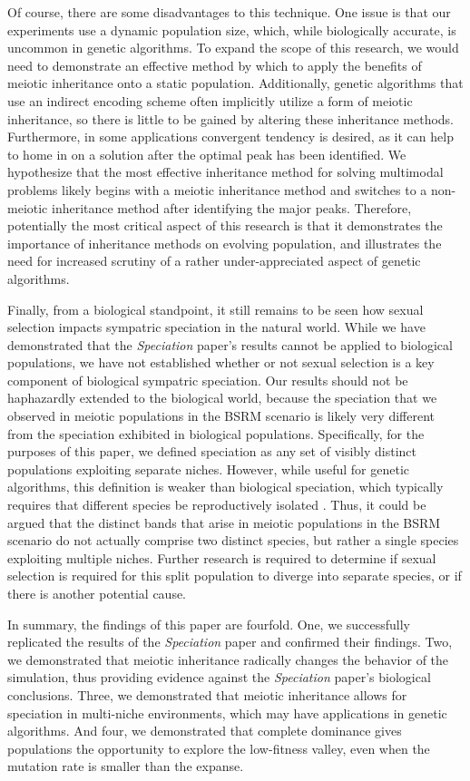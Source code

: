 \documentclass{article}
\begin{document}
Of course, there are some disadvantages to this technique. One issue is that our experiments use a dynamic population size, which, while biologically accurate, is uncommon in genetic algorithms. To expand the scope of this research, we would need to demonstrate an effective method by which to apply the benefits of meiotic inheritance onto a static population. Additionally, genetic algorithms that use an indirect encoding scheme often implicitly utilize a form of meiotic inheritance, so there is little to be gained by altering these inheritance methods. Furthermore, in some applications convergent tendency is desired, as it can help to home in on a solution after the optimal peak has been identified. We hypothesize that the most effective inheritance method for solving multimodal problems likely begins with a meiotic inheritance method and switches to a non-meiotic inheritance method after identifying the major peaks. Therefore, potentially the most critical aspect of this research is that it demonstrates the importance of inheritance methods on evolving population, and illustrates the need for increased scrutiny of a rather under-appreciated aspect of genetic algorithms.

Finally, from a biological standpoint, it still remains to be seen how sexual selection impacts sympatric speciation in the natural world. While we have demonstrated that the \textit{Speciation} paper’s results cannot be applied to biological populations, we have not established whether or not sexual selection is a key component of biological sympatric speciation. Our results should not be haphazardly extended to the biological world, because the speciation that we observed in meiotic populations in the BSRM scenario is likely very different from the speciation exhibited in biological populations. Specifically, for the purposes of this paper, we defined speciation as any set of visibly distinct populations exploiting separate niches. However, while useful for genetic algorithms, this definition is weaker than biological speciation, which typically requires that different species be reproductively isolated \cite{TEXTBOOK}. Thus, it could be argued that the distinct bands that arise in meiotic populations in the BSRM scenario do not actually comprise two distinct species, but rather a single species exploiting multiple niches. Further research is required to determine if sexual selection is required for this split population to diverge into separate species, or if there is another potential cause.

In summary, the findings of this paper are fourfold. One, we successfully replicated the results of the \textit{Speciation} paper and confirmed their findings. Two, we demonstrated that meiotic inheritance radically changes the behavior of the simulation, thus providing evidence against the \textit{Speciation} paper's biological conclusions. Three, we demonstrated that meiotic inheritance allows for speciation in multi-niche environments, which may have applications in genetic algorithms. And four, we demonstrated that complete dominance gives populations the opportunity to explore the low-fitness valley, even when the mutation rate is smaller than the expanse. 
\end{document}
